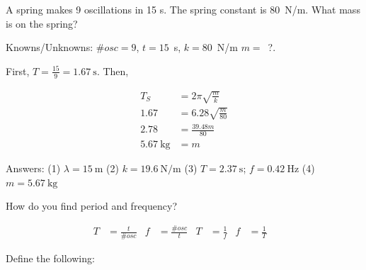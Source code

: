 \documentclass[10pt]{exam}
\begin{document}
\begin{questions}
\begin{solution}[\stretch{1}]
  \end{solution}

\question
  A spring makes 9 oscillations in 15 s. The spring constant is 80~N/m.  What mass is on the spring?
  
  \begin{solution}[\stretch{1}]
    Knowns/Unknowns: $\#osc=9$, $t=15$~s, $k=80$~N/m $m=$~?.
    
    First, $T = \frac{15}{9} = \SI{1.67}{\second}$.  Then,
    
    \begin{align*} 
      T_S  &= 2\pi \sqrt{\frac{m}{k}} \\
      1.67 &= 6.28 \sqrt{\frac{m}{80}}\\
      2.78 &= \frac{39.48m}{80} \\
      \SI{5.67}{\kilo\gram} &= m
    \end{align*}
  \end{solution}

\ifprintanswers
\else
  \begin{EnvUplevel}
    \noindent
    {\small Answers: 
      (1) $\lambda=\SI{15}{\meter}$ 
      (2) $k=\SI{19.6}{\newton\per\meter}$ 
      (3) $T=\SI{2.37}{\second}$; $f=\SI{0.42}{\hertz}$
      (4) $m=\SI{5.67}{\kilo\gram}$
    }
  \end{EnvUplevel}
\fi

\pagebreak

\question
  How do you find period and frequency?

  \begin{solution}[\stretch{2}]
    \begin{align*}
      T &= \frac{t}{\#osc} &
      f &= \frac{\#osc}{t} &
      T &= \frac{1}{f} &
      f &= \frac{1}{T} &
    \end{align*}
  \end{solution}

\question
  Define the following:

\end{questions}
\end{document}

